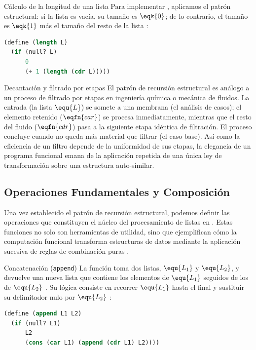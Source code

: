 \begin{ejemplo}{Cálculo de la longitud de una lista}
Para implementar , aplicamos el patrón estructural: si la lista es vacía, su tamaño es $\eqk{0}$; de lo contrario, el tamaño es $\eqk{1}$ más el tamaño del resto de la lista \cite{SICP}:
\begin{lstlisting}[language=Lisp]
(define (length L)
  (if (null? L)
      0
      (+ 1 (length (cdr L)))))
\end{lstlisting}
\end{ejemplo}

\begin{fisicaconexion}{Decantación y filtrado por etapas}
El patrón de recursión estructural es análogo a un proceso de filtrado por etapas en ingeniería química o mecánica de fluidos. La entrada (la lista $\equ{L}$) se somete a una membrana (el análisis de casos); el elemento retenido ($\eqfn{car}$) se procesa inmediatamente, mientras que el resto del fluido ($\eqfn{cdr}$) pasa a la siguiente etapa idéntica de filtración. El proceso concluye cuando no queda más material que filtrar (el caso base). Así como la eficiencia de un filtro depende de la uniformidad de sus etapas, la elegancia de un programa funcional emana de la aplicación repetida de una única ley de transformación sobre una estructura auto-similar.
\end{fisicaconexion}

\subsection{Operaciones Fundamentales y Composición}
\label{subsec:4_3_4_operaciones}

Una vez establecido el patrón de recursión estructural, podemos definir las operaciones que constituyen el núcleo del procesamiento de listas en . Estas funciones no solo son herramientas de utilidad, sino que ejemplifican cómo la computación funcional transforma estructuras de datos mediante la aplicación sucesiva de reglas de combinación puras \cite{SICP, HtDP}.

\begin{definicion}{Concatenación (\texttt{append})}
La función  toma dos listas, $\equ{L_1}$ y $\equ{L_2}$, y devuelve una nueva lista que contiene los elementos de $\equ{L_1}$ seguidos de los de $\equ{L_2}$ \cite{SICP}. Su lógica consiste en recorrer $\equ{L_1}$ hasta el final y sustituir su delimitador nulo por $\equ{L_2}$ \cite{SICP}:
\begin{lstlisting}[language=Lisp]
(define (append L1 L2)
  (if (null? L1)
      L2
      (cons (car L1) (append (cdr L1) L2))))
\end{lstlisting}
\end{definicion}

